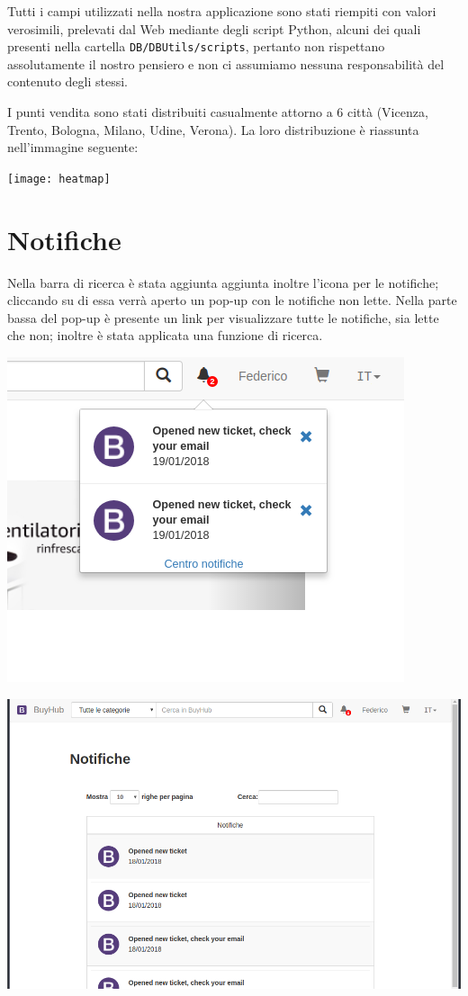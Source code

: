 Tutti i campi utilizzati nella nostra applicazione sono stati riempiti con valori verosimili, prelevati dal Web mediante degli script Python, alcuni dei quali presenti nella cartella \texttt{DB/DBUtils/scripts}, pertanto non rispettano assolutamente il nostro pensiero e non ci assumiamo nessuna responsabilità del contenuto degli stessi.

I punti vendita sono stati distribuiti casualmente attorno a 6 città (Vicenza, Trento, Bologna, Milano, Udine, Verona). La loro distribuzione è riassunta nell'immagine seguente:
\begin{center}
  \texttt{[image: heatmap]}
\end{center}

\chapter{Notifiche}
Nella barra di ricerca è stata aggiunta aggiunta inoltre l'icona per le notifiche; cliccando su di essa verrà aperto un pop-up con le notifiche non lette.
Nella parte bassa del pop-up è presente un link per visualizzare tutte le notifiche, sia lette che non; inoltre è stata applicata una funzione di ricerca.

\begin{center}
\includegraphics[width=0.5\linewidth]{img/notificationpopup7}
\end{center}

\begin{center}
\includegraphics[width=0.7\linewidth]{img/notifications}
\end{center}



